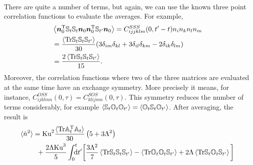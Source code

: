 \documentclass[thesis.tex]{subfiles}
\begin{document}
\begin{align*}
\end{align*}
There are quite a number of terms, but again, we can use the known three point correlation functions
 to evaluate the averages. For example, 
\begin{align*}
	&\left\langle\mbox{\boldmath$n$}_0^{\mathrm T}\mathbb{S}_t\mathbb{S}_t \mbox{\boldmath$n$}_0 \mbox{\boldmath$n$}_{0}^{\mathrm T}\mathbb{S}_{t'}\mbox{\boldmath$n$}_{0} \right\rangle
	= C^{SSS}_{ijjklm}(0, t'-t)n_in_kn_ln_m \\
	&= \frac{\left\langle\mbox{Tr} \mathbb{S}_t\mathbb{S}_{t}\mathbb{S}_{t'}\right\rangle}{30} (3 \delta_{im} \delta_{kl}+3 \delta_{il} \delta_{km}-2 \delta_{ik} \delta_{lm})\\
	&= \frac{2\left\langle\mbox{Tr} \mathbb{S}_t\mathbb{S}_{t}\mathbb{S}_{t'}\right\rangle}{15}.
\end{align*}
Moreover, the correlation functions where two of the three matrices are evaluated at the same time have an exchange symmetry. More precisely it means, for instance, $C^{OSS}_{ijklmn}(0,\tau)=C^{SOS}_{klijmn}(0,\tau)$. This symmetry reduces the number of terms considerably, for example $\langle \mathbb{S}_t \mathbb{O}_t \mathbb{O}_{t'}\rangle = \langle \mathbb{O}_t \mathbb{S}_t \mathbb{O}_{t'}\rangle$. After averaging, the result is
\begin{align*}
\langle \dot n^2\rangle &=\mbox{Ku}^2\frac{\langle\mbox{Tr}\mathbb{A}_t^{\mathrm T} \mathbb{A}_t\rangle}{30}\left(5 + 3 \Lambda^2\right) \\
	&\,\,\,+ \frac{2 \Lambda \mbox{Ku}^3}{5} \int_0^{t}\!\!\!\!{\rm d}t' \bigg[\frac{3 \Lambda^2}{7}\left\langle\mbox{Tr} \mathbb{S}_t\mathbb{S}_{t}\mathbb{S}_{t'}\right\rangle - \left\langle\mbox{Tr} \mathbb{O}_t\mathbb{O}_{t}\mathbb{S}_{t'}\right\rangle + 2 \Lambda \left\langle\mbox{Tr} \mathbb{S}_t\mathbb{O}_{t}\mathbb{S}_{t'}\right\rangle\bigg]
\end{align*}
\end{document}
